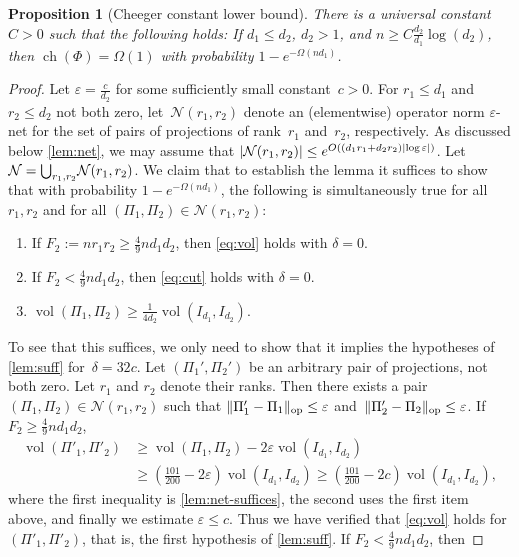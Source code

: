 \documentclass[aos]{imsart}
\newtheorem{prop}[theorem]{Proposition}
\theoremstyle{definition}
\numberwithin{equation}{section}
\DeclareMathOperator{\op}{op}
\DeclareMathOperator{\vol}{vol}
\DeclareMathOperator{\ch}{ch}
\DeclarePairedDelimiter{\abs}{\lvert}{\rvert}
\DeclarePairedDelimiter{\norm}{\lVert}{\rVert}
\newcommand{\eps}{\varepsilon}
\newcommand{\cN}{\mathcal{N}}
\begin{document}
\begin{appendix}
\begin{prop}[Cheeger constant lower bound]\label{lem:union}
There is a universal constant $C>0$ such that the following holds:
If $d_1 \leq d_2$, $d_2>1$, and $n \geq C \frac{d_2}{d_1} \log (d_2)$, then $\ch(\Phi) = \Omega(1)$ with probability $1 - e^{- \Omega(n d_1)}$.
\end{prop}
\begin{proof}
Let $\eps = \frac c {d_2}$ for some sufficiently small constant~$c>0$.
For $r_1 \leq d_1$ and $r_2 \leq d_2$ not both zero, let~$\cN(r_1,r_2)$ denote an (elementwise) operator norm $\eps$-net for the set of pairs of projections of rank~$r_1$ and~$r_2$, respectively.
As discussed below \cref{lem:net}, we may assume that $\abs{\cN(r_1,r_2)} \leq e^{O((d_1r_1 + d_2r_2) \abs{\log\eps})}$.
Let $\mathcal N = \smash{\bigcup_{r_1,r_2}} \mathcal N(r_1,r_2)$.
We claim that to establish the lemma it suffices to show that with probability $1 - e^{- \Omega(n d_1)}$, the following is simultaneously true for all $r_1,r_2$ and for all $(\Pi_1,\Pi_2) \in \mathcal N(r_1,r_2)$:
\begin{enumerate}
\item If $F_2 := n r_1 r_2 \geq \frac49 n d_1 d_2$, then \cref{eq:vol} holds with $\delta=0$.
\item If $F_2 < \frac49 n d_1 d_2$, then \cref{eq:cut} holds with $\delta=0$.
\item $\vol(\Pi_1,\Pi_2) \geq \frac1{4d_2} \vol(I_{d_1}, I_{d_2})$.
\end{enumerate}
To see that this suffices, we only need to show that it implies the hypotheses of \cref{lem:suff} for~$\delta = 32 c$.
Let $(\Pi_1',\Pi_2')$ be an arbitrary pair of projections, not both zero.
Let $r_1$ and $r_2$ denote their ranks.
Then there exists a pair $(\Pi_1,\Pi_2) \in \cN(r_1,r_2)$ such that $\norm{\Pi'_1 - \Pi_1}_{\op} \leq \eps$ and~$\norm{\Pi'_2 - \Pi_2}_{\op} \leq \eps$.
If $F_2 \geq \frac49 n d_1 d_2$,
\begin{align*}
  \vol(\Pi'_1,\Pi'_2)
&\geq \vol(\Pi_1,\Pi_2) - 2 \eps \vol(I_{d_1}, I_{d_2}) \\
&\geq \left( \frac{101}{200} - 2 \eps \right) \vol(I_{d_1}, I_{d_2})
\geq \left( \frac{101}{200} - 2 c \right) \vol(I_{d_1}, I_{d_2}),
\end{align*}
where the first inequality is \cref{lem:net-suffices}, the second uses the first item above, and finally we estimate $\eps \leq c$.
Thus we have verified that \cref{eq:vol} holds for $(\Pi'_1,\Pi'_2)$, that is, the first hypothesis of \cref{lem:suff}.
If $F_2 < \frac49 n d_1 d_2$, then

\end{proof}
\end{appendix}
\end{document}
